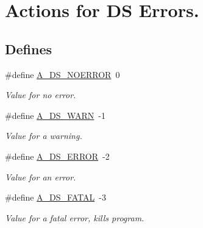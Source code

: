 \hypertarget{group___a___d_s___actions}{
\section{Actions for DS Errors.}
\label{group___a___d_s___actions}
}
\subsection*{Defines}
\begin{DoxyCompactItemize}
\item 
\hypertarget{group___a___d_s___actions_ga83fd1c7379ac085b8a9550b8d64f3449}{
\#define \hyperlink{group___a___d_s___actions_ga83fd1c7379ac085b8a9550b8d64f3449}{A\_\-DS\_\-NOERROR}~0}
\label{group___a___d_s___actions_ga83fd1c7379ac085b8a9550b8d64f3449}

\begin{DoxyCompactList}\small\item\em Value for no error. \item\end{DoxyCompactList}\item 
\hypertarget{group___a___d_s___actions_gad61c12e433c47da75f4322d9358c3617}{
\#define \hyperlink{group___a___d_s___actions_gad61c12e433c47da75f4322d9358c3617}{A\_\-DS\_\-WARN}~-\/1}
\label{group___a___d_s___actions_gad61c12e433c47da75f4322d9358c3617}

\begin{DoxyCompactList}\small\item\em Value for a warning. \item\end{DoxyCompactList}\item 
\hypertarget{group___a___d_s___actions_gabaa9a22cc1abc78916b99695489f8df8}{
\#define \hyperlink{group___a___d_s___actions_gabaa9a22cc1abc78916b99695489f8df8}{A\_\-DS\_\-ERROR}~-\/2}
\label{group___a___d_s___actions_gabaa9a22cc1abc78916b99695489f8df8}

\begin{DoxyCompactList}\small\item\em Value for an error. \item\end{DoxyCompactList}\item 
\hypertarget{group___a___d_s___actions_gad3e083f0c8d34073d3597724c2a264f6}{
\#define \hyperlink{group___a___d_s___actions_gad3e083f0c8d34073d3597724c2a264f6}{A\_\-DS\_\-FATAL}~-\/3}
\label{group___a___d_s___actions_gad3e083f0c8d34073d3597724c2a264f6}

\begin{DoxyCompactList}\small\item\em Value for a fatal error, kills program. \item\end{DoxyCompactList}\end{DoxyCompactItemize}


